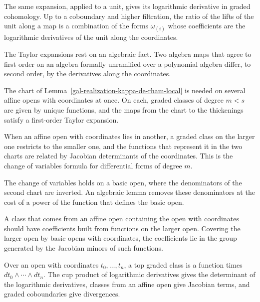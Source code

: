 The same expansion, applied to a unit, gives its logarithmic derivative in graded cohomology. Up to a coboundary and
higher filtration, the ratio of the lifts of the unit along a map is a combination of the forms $\omega_{(i)}$ whose
coefficients are the logarithmic derivatives of the unit along the coordinates.

The Taylor expansions rest on an algebraic fact. Two algebra maps that agree to first order on an algebra formally
unramified over a polynomial algebra differ, to second order, by the derivatives along the coordinates.

The chart of Lemma~\ref{gal-realization-kappa-de-rham-local} is needed on several affine opens with coordinates at once.
On each, graded classes of degree $m<s$ are given by unique functions, and the maps from the chart to the thickenings
satisfy a first-order Taylor expansion.

When an affine open with coordinates lies in another, a graded class on the larger one restricts to the smaller one, and
the functions that represent it in the two charts are related by Jacobian determinants of the coordinates. This is the
change of variables formula for differential forms of degree $m$.

The change of variables holds on a basic open, where the denominators of the second chart are inverted. An algebraic
lemma removes these denominators at the cost of a power of the function that defines the basic open.

A class that comes from an affine open containing the open with coordinates should have coefficients built from functions
on the larger open. Covering the larger open by basic opens with coordinates, the coefficients lie in the group generated
by the Jacobian minors of such functions.

Over an open with coordinates $t_0,\ldots,t_n$, a top graded class is a function times $dt_0\wedge\cdots\wedge dt_n$. The
cup product of logarithmic derivatives gives the determinant of the logarithmic derivatives, classes from an affine open
give Jacobian terms, and graded coboundaries give divergences.

